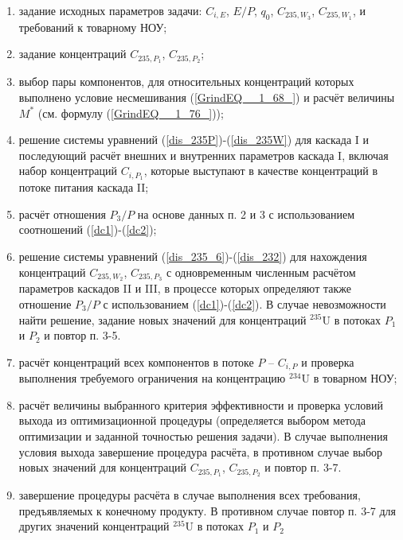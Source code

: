 \begin{enumerate}
    \item задание исходных параметров задачи: $C_{i,E}$, $E/P$, $q_0$, $C_{235,{W_3}}$, $C_{235,{W_1}}$, и требований к товарному НОУ;
    \item задание концентраций $C_{235,{P_1}}$, $C_{235,{P_2}}$;
    \item выбор пары компонентов, для относительных концентраций которых выполнено условие несмешивания (\ref{GrindEQ__1_68_}) и расчёт величины $M^{*}$ (см. формулу (\ref{GrindEQ__1_76_}));
    \item решение системы уравнений (\ref{dis_235P})-(\ref{dis_235W}) для каскада I и последующий расчёт внешних и внутренних параметров каскада I, включая набор концентраций $C_{i,{P_1}}$, которые выступают в качестве концентраций в потоке питания каскада II;
    \item расчёт отношения ${P_3}/P$ на основе данных п. 2 и 3 с использованием соотношений (\ref{dc1})-(\ref{dc2});
    \item решение системы уравнений (\ref{dis_235_6})-(\ref{dis_232}) для нахождения концентраций $C_{235,{W_2}}$, $C_{235,{P_3}}$ с одновременным численным расчётом параметров каскадов II и III, в процессе которых определяют также отношение ${P_3}/P$ с использованием (\ref{dc1})-(\ref{dc2}). В случае невозможности найти решение, задание новых значений для концентраций $^{235}$U в потоках $P_1$ и $P_2$ и повтор п. 3-5. 
    \item расчёт концентраций всех компонентов в потоке $P$ -- $C_{i, P}$ и проверка выполнения требуемого ограничения на концентрацию $^{234}$U в товарном НОУ;
    \item расчёт величины выбранного критерия эффективности и проверка условий выхода из оптимизационной процедуры (определяется выбором метода оптимизации и заданной точностью решения задачи). В случае выполнения условия выхода завершение процедура расчёта, в противном случае выбор новых значений для концентраций $C_{235,{P_1}}$, $C_{235,{P_2}}$ и повтор п. 3-7.
    \item завершение процедуры расчёта в случае выполнения всех требования, предъявляемых к конечному продукту. В противном случае повтор п. 3-7 для других значений концентраций $^{235}$U в потоках $P_1$ и $P_2$
\end{enumerate}

